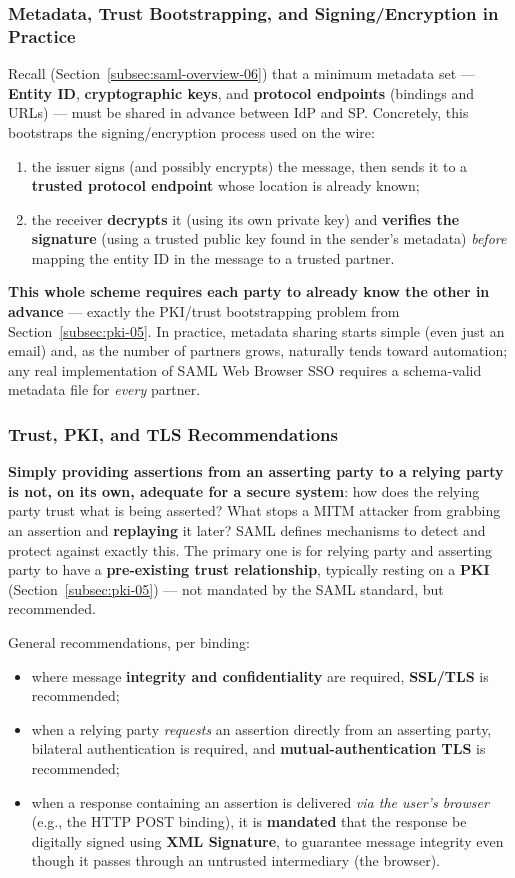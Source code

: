 \documentclass[12pt, a4paper]{article}
\begin{document}
\subsubsection{Metadata, Trust Bootstrapping, and Signing/Encryption in Practice}
Recall (Section~\ref{subsec:saml-overview-06}) that a minimum metadata set --- \textbf{Entity ID}, \textbf{cryptographic keys}, and \textbf{protocol endpoints} (bindings and URLs) --- must be shared in advance between IdP and SP. Concretely, this bootstraps the signing/encryption process used on the wire:
\begin{enumerate}
    \item the issuer signs (and possibly encrypts) the message, then sends it to a \textbf{trusted protocol endpoint} whose location is already known;
    \item the receiver \textbf{decrypts} it (using its own private key) and \textbf{verifies the signature} (using a trusted public key found in the sender's metadata) \emph{before} mapping the entity ID in the message to a trusted partner.
\end{enumerate}
\textcolor{blue!50!black}{\textbf{This whole scheme requires each party to already know the other in advance}} --- exactly the PKI/trust bootstrapping problem from Section~\ref{subsec:pki-05}. In practice, metadata sharing starts simple (even just an email) and, as the number of partners grows, naturally tends toward automation; any real implementation of SAML Web Browser SSO requires a schema-valid metadata file for \emph{every} partner.

\subsubsection{Trust, PKI, and TLS Recommendations}
\textcolor{red!70!black}{\textbf{Simply providing assertions from an asserting party to a relying party is not, on its own, adequate for a secure system}}: how does the relying party trust what is being asserted? What stops a MITM attacker from grabbing an assertion and \textbf{replaying} it later? SAML defines mechanisms to detect and protect against exactly this. The primary one is for relying party and asserting party to have a \textbf{pre-existing trust relationship}, typically resting on a \textbf{PKI} (Section~\ref{subsec:pki-05}) --- not mandated by the SAML standard, but recommended.

General recommendations, per binding:
\begin{itemize}
    \item where message \textbf{integrity and confidentiality} are required, \textbf{SSL/TLS} is recommended;
    \item when a relying party \emph{requests} an assertion directly from an asserting party, bilateral authentication is required, and \textbf{mutual-authentication TLS} is recommended;
    \item when a response containing an assertion is delivered \emph{via the user's browser} (e.g., the HTTP POST binding), it is \textbf{mandated} that the response be digitally signed using \textbf{XML Signature}, to guarantee message integrity even though it passes through an untrusted intermediary (the browser).
\end{itemize}
\end{document}
